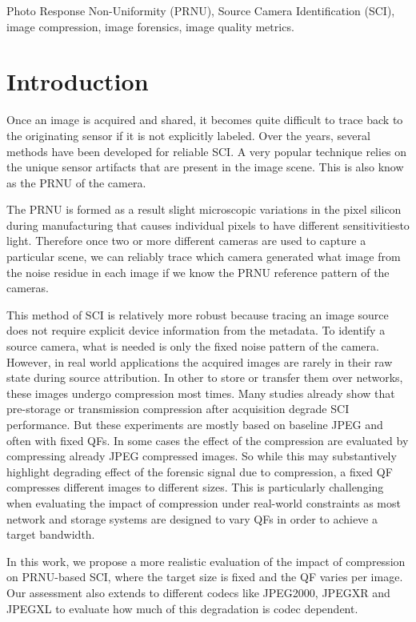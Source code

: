 \documentclass[conference]{IEEEtran}
\begin{document}
\begin{IEEEkeywords}
Photo Response Non-Uniformity (PRNU), Source Camera Identification (SCI),
image compression, image forensics, image quality metrics.
\end{IEEEkeywords}

\section{Introduction}

Once an image is acquired and shared, it becomes quite difficult to trace back
to the originating sensor if it is not explicitly labeled. Over the years, 
several methods have been developed for reliable SCI.
A very popular technique relies on the unique sensor artifacts that are
present in the image scene. This is also know as the PRNU of the camera.

The PRNU is formed as a result slight microscopic variations in the pixel silicon during manufacturing that causes individual pixels to have different sensitivitiesto light. Therefore once two or more different cameras are used to capture a particular scene,
we can reliably trace which camera generated what image from the noise residue in each image if we know the PRNU reference pattern of the cameras.

This method of SCI is relatively more robust because tracing an image source does not require explicit device
information from the metadata. To identify a source camera, what is needed is only the fixed noise pattern
of the camera.
However, in real world applications the acquired images are rarely in their raw state during source attribution.
In other to store or transfer them over networks, these images undergo compression most times.
Many studies already show that pre-storage or transmission compression after acquisition degrade SCI performance.
But these experiments are mostly based on baseline JPEG and often with fixed QFs. In some cases the effect of the compression are evaluated by compressing already JPEG compressed images. So while this may substantively highlight degrading effect of the forensic signal due to compression, a fixed QF compresses different images to different sizes. This is particularly challenging when evaluating the impact of compression under real-world constraints as most network and storage systems are designed to vary QFs in order to achieve a target bandwidth.

In this work, we propose a more realistic evaluation of the impact of compression on PRNU-based SCI, where the target size is fixed and the QF varies per image. Our assessment also extends to different codecs like JPEG2000, JPEGXR and JPEGXL to evaluate how much of this degradation is codec dependent.
\end{document}
